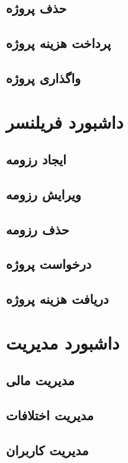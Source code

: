 \subsection{حذف پروژه}


\subsection{پرداخت هزینه پروژه}


\subsection{واگذاری پروژه}



\section{داشبورد فریلنسر}


\subsection{ایجاد رزومه}


\subsection{ویرایش رزومه}


\subsection{حذف رزومه}


\subsection{درخواست پروژه}


\subsection{دریافت هزینه پروژه}



\section{داشبورد مدیریت}


\subsection{مدیریت مالی}


\subsection{مدیریت اختلافات}


\subsection{مدیریت کاربران}


